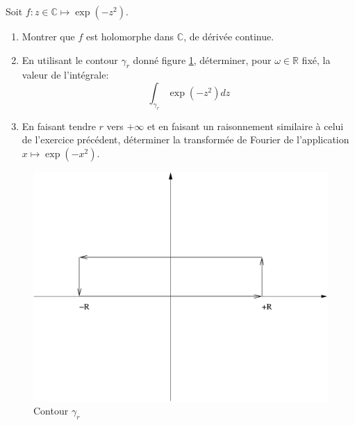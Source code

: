 \documentclass[a4paper, 12pt]{amsart}
\begin{document}
\begin{fex}
 Soit $f \colon z \in \mathbb{C} \mapsto \exp(-z^2)$.
\begin{enumerate}
  \item Montrer que $f$ est holomorphe dans $\mathbb{C}$, de dérivée continue.
  \item En utilisant le contour $\gamma_r$ donné figure \ref{fig:contour3},
déterminer, pour
  $\omega \in \mathbb{R}$ fixé, la valeur de l'intégrale:
  \[
  \int_{\gamma_r} \exp(-z^2)dz
  \]
  \item En faisant tendre $r$ vers $+\infty$ et en faisant un raisonnement
  similaire à celui de l'exercice précédent, déterminer la transformée de
  Fourier de l'application $x \mapsto \exp(-x^2)$.
\end{enumerate}
\end{fex}
 \begin{figure}[ht]
\includegraphics[scale=0.3]{contour_gauss.pdf}
\caption{Contour $\gamma_r$}\label{fig:contour3}
\end{figure}
\end{document}
